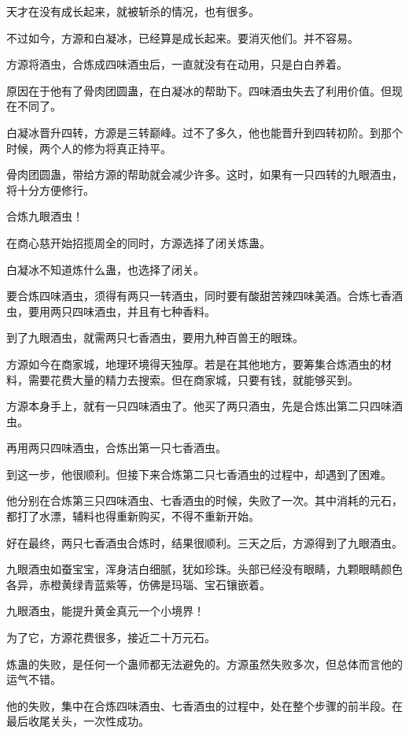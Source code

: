 \begin{this_body}
天才在没有成长起来，就被斩杀的情况，也有很多。

不过如今，方源和白凝冰，已经算是成长起来。要消灭他们。并不容易。

方源将酒虫，合炼成四味酒虫后，一直就没有在动用，只是白白养着。

原因在于他有了骨肉团圆蛊，在白凝冰的帮助下。四味酒虫失去了利用价值。但现在不同了。

白凝冰晋升四转，方源是三转巅峰。过不了多久，他也能晋升到四转初阶。到那个时候，两个人的修为将真正持平。

骨肉团圆蛊，带给方源的帮助就会减少许多。这时，如果有一只四转的九眼酒虫，将十分方便修行。

合炼九眼酒虫！

在商心慈开始招揽周全的同时，方源选择了闭关炼蛊。

白凝冰不知道炼什么蛊，也选择了闭关。

要合炼四味酒虫，须得有两只一转酒虫，同时要有酸甜苦辣四味美酒。合炼七香酒虫，要用两只四味酒虫，并且有七种香料。

到了九眼酒虫，就需两只七香酒虫，要用九种百兽王的眼珠。

方源如今在商家城，地理环境得天独厚。若是在其他地方，要筹集合炼酒虫的材料，需要花费大量的精力去搜索。但在商家城，只要有钱，就能够买到。

方源本身手上，就有一只四味酒虫了。他买了两只酒虫，先是合炼出第二只四味酒虫。

再用两只四味酒虫，合炼出第一只七香酒虫。

到这一步，他很顺利。但接下来合炼第二只七香酒虫的过程中，却遇到了困难。

他分别在合炼第三只四味酒虫、七香酒虫的时候，失败了一次。其中消耗的元石，都打了水漂，辅料也得重新购买，不得不重新开始。

好在最终，两只七香酒虫合炼时，结果很顺利。三天之后，方源得到了九眼酒虫。

九眼酒虫如蚕宝宝，浑身洁白细腻，犹如珍珠。头部已经没有眼睛，九颗眼睛颜色各异，赤橙黄绿青蓝紫等，仿佛是玛瑙、宝石镶嵌着。

九眼酒虫，能提升黄金真元一个小境界！

为了它，方源花费很多，接近二十万元石。

炼蛊的失败，是任何一个蛊师都无法避免的。方源虽然失败多次，但总体而言他的运气不错。

他的失败，集中在合炼四味酒虫、七香酒虫的过程中，处在整个步骤的前半段。在最后收尾关头，一次性成功。


\end{this_body}
